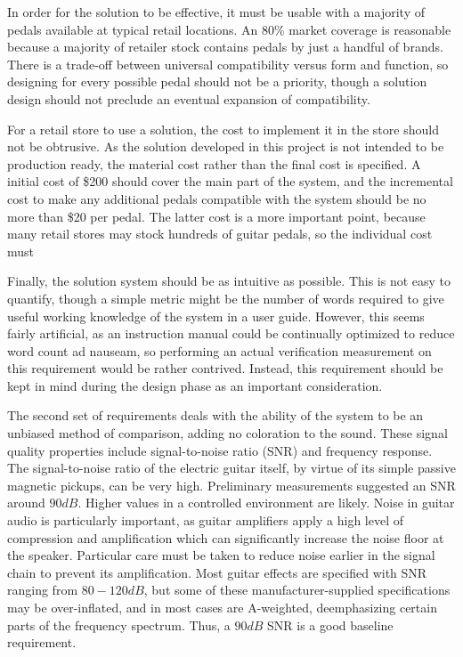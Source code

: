 In order for the solution to be effective, it must be usable with a majority of pedals available at typical retail locations.  An 80\% market coverage is reasonable because a majority of retailer stock contains pedals by just a handful of brands.  There is a trade-off between universal compatibility versus form and function, so designing for every possible pedal should not be a priority, though a solution design should not preclude an eventual expansion of compatibility.

For a retail store to use a solution, the cost to implement it in the store should not be obtrusive.  As the solution developed in this project is not intended to be production ready, the material cost rather than the final cost is specified.  A initial cost of \$200 should cover the main part of the system, and the incremental cost to make any additional pedals compatible with the system should be no more than \$20 per pedal.  The latter cost is a more important point, because many retail stores may stock hundreds of guitar pedals, so the individual cost must 

Finally, the solution system should be as intuitive as possible.  This is not easy to quantify, though a simple metric might be the number of words required to give useful working knowledge of the system in a user guide.  However, this seems fairly artificial, as an instruction manual could be continually optimized to reduce word count ad nauseam, so performing an actual verification measurement on this requirement would be rather contrived.  Instead, this requirement should be kept in mind during the design phase as an important consideration.

The second set of requirements deals with the ability of the system to be an unbiased method of comparison, adding no coloration to the sound.  These signal quality properties include signal-to-noise ratio (SNR) and frequency response.  The signal-to-noise ratio of the electric guitar itself, by virtue of its simple passive magnetic pickups, can be very high.  Preliminary measurements suggested an SNR around $90dB$.  Higher values in a controlled environment are likely.  Noise in guitar audio is particularly important, as guitar amplifiers apply a high level of compression and amplification which can significantly increase the noise floor at the speaker.  Particular care must be taken to reduce noise earlier in the signal chain to prevent its amplification.  Most guitar effects are specified with SNR ranging from $80-120dB$, but some of these manufacturer-supplied specifications may be over-inflated, and in most cases are A-weighted, deemphasizing certain parts of the frequency spectrum.  Thus, a $90dB$ SNR is a good baseline requirement.

